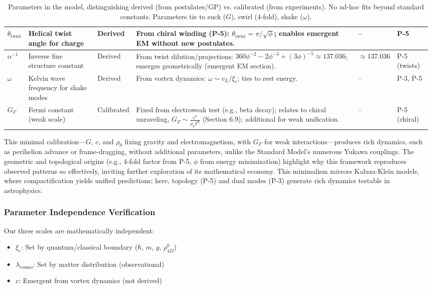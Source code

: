 \begin{table}[H]
\begin{tabularx}{\linewidth}{|p{1.5cm}|p{2cm}|l|X|p{3cm}|p{3cm}|}
\hline
$\theta_{\text{twist}}$ & Helical twist angle for charge & Derived & From chiral winding (P-5): $\theta_{\text{twist}} = \pi / \sqrt{\phi}$; enables emergent EM without new postulates. & -- & P-5 \\
\hline
$\alpha^{-1}$ & Inverse fine structure constant & Derived & From twist dilution/projections: $360 \phi^{-2} - 2 \phi^{-3} + (3 \phi)^{-5} \approx 137.036$; emerges geometrically (emergent EM section). & $\approx 137.036$ & P-5 (twists) \\
\hline
$\omega$ & Kelvin wave frequency for shake modes & Derived & From vortex dynamics: $\omega \sim v_L / \xi_c$; ties to rest energy. & -- & P-3, P-5 \\
\hline
$G_F$ & Fermi constant (weak scale) & Calibrated & Fixed from electroweak test (e.g., beta decay); relates to chiral unraveling, $G_F \sim \frac{c^4}{\rho_0 \Gamma^2}$ (Section 6.9); additional for weak unification. & -- & P-5 (chiral) \\
\hline
\end{tabularx}
\caption{Parameters in the model, distinguishing derived (from postulates/GP) vs. calibrated (from experiments). No ad-hoc fits beyond standard constants. Parameters tie to suck ($G$), swirl (4-fold), shake ($\omega$).}
\label{tab:parameters}
\end{table}

This minimal calibration---$G$, $c$, and $\rho_0$ fixing gravity and electromagnetism, with $G_F$ for weak interactions---produces rich dynamics, such as perihelion advance or frame-dragging, without additional parameters, unlike the Standard Model's numerous Yukawa couplings. The geometric and topological origins (e.g., 4-fold factor from P-5, $\phi$ from energy minimization) highlight why this framework reproduces observed patterns so effectively, inviting further exploration of its mathematical economy. This minimalism mirrors Kaluza-Klein models, where compactification yields unified predictions; here, topology (P-5) and dual modes (P-3) generate rich dynamics testable in astrophysics.

\subsubsection{Parameter Independence Verification}

Our three scales are mathematically independent:
\begin{itemize}
\item $\xi_c$: Set by quantum/classical boundary ($\hbar$, $m$, $g$, $\rho_{4D}^0$)
\item $\lambda_{\text{cosmo}}$: Set by matter distribution (observational)
\item $c$: Emergent from vortex dynamics (not derived)
\end{itemize}


